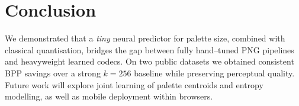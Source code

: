 \documentclass{../manuscript/Electrical new template/elektr}
\begin{document}
\section{Conclusion}
We demonstrated that a \emph{tiny} neural predictor for palette size, combined with classical
quantisation, bridges the gap between fully hand--tuned PNG pipelines and heavyweight learned codecs.  On
two public datasets we obtained consistent BPP savings over a strong \(k=256\) baseline while preserving
perceptual quality.  Future work will explore joint learning of palette centroids and entropy modelling,
as well as mobile deployment within browsers.



\end{document}
